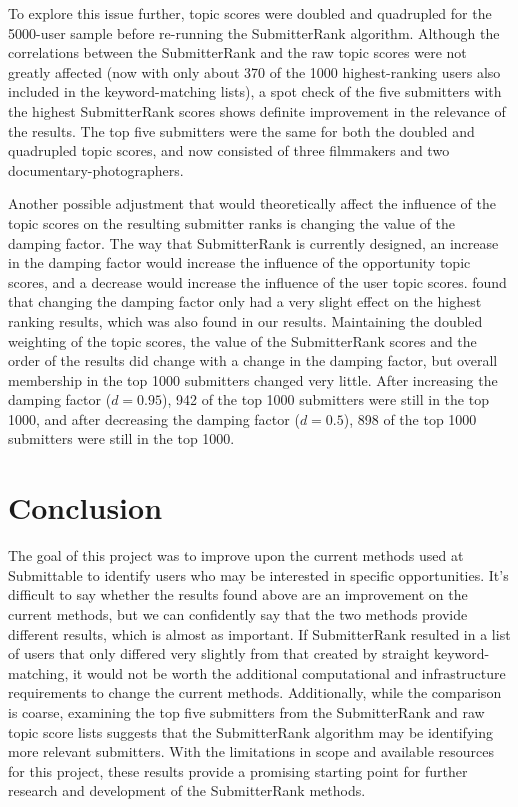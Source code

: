 \documentclass[12pt]{report}   %
\begin{document}
To explore this issue further, topic scores were doubled and quadrupled for the 5000-user sample before re-running the SubmitterRank algorithm. Although the correlations between the SubmitterRank and the raw topic scores were not greatly affected (now with only about 370 of the 1000 highest-ranking users also included in the keyword-matching lists), a spot check of the five submitters with the highest SubmitterRank scores shows definite improvement in the relevance of the results. The top five submitters were the same for both the doubled and quadrupled topic scores, and now consisted of three filmmakers and two documentary-photographers. 

Another possible adjustment that would theoretically affect the influence of the topic scores on the resulting submitter ranks is changing the value of the damping factor. The way that SubmitterRank is currently designed, an increase in the damping factor would increase the influence of the opportunity topic scores, and a decrease would increase the influence of the user topic scores.  found that changing the damping factor only had a very slight effect on the highest ranking results, which was also found in our results. Maintaining the doubled weighting of the topic scores, the value of the SubmitterRank scores and the order of the results did change with a change in the damping factor, but overall membership in the top 1000 submitters changed very little. After increasing the damping factor ($d = 0.95$), 942 of the top 1000 submitters were still in the top 1000, and after decreasing the damping factor ($d = 0.5$), 898 of the top 1000 submitters were still in the top 1000.

\chapter{Conclusion} 

The goal of this project was to improve upon the current methods used at Submittable to identify users who may be interested in specific opportunities. It's difficult to say whether the results found above are an improvement on the current methods, but we can confidently say that the two methods provide different results, which is almost as important. If SubmitterRank resulted in a list of users that only differed very slightly from that created by straight keyword-matching, it would not be worth the additional computational and infrastructure requirements to change the current methods. Additionally, while the comparison is coarse, examining the top five submitters from the SubmitterRank and raw topic score lists suggests that the SubmitterRank algorithm may be identifying more relevant submitters. With the limitations in scope and available resources for this project, these results provide a promising starting point for further research and development of the SubmitterRank methods.
\end{document}
